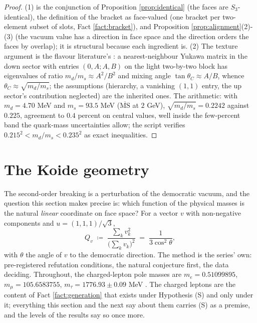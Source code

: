 \documentclass[11pt]{article}
\theoremstyle{definition}
\begin{document}
\begin{proof}
(1) is the conjunction of Proposition \ref{prop:identical} (the faces are $S_{3}$-identical), the definition of the bracket as face-valued (one bracket per two-element subset of slots, Fact \ref{fact:bracket}), and Proposition \ref{prop:alignment}(2)-(3) (the vacuum value has a direction in face space and the direction orders the faces by overlap); it is structural because each ingredient is. (2) The texture argument is the flavour literature's \cite{GST1968, Fritzsch1978}: a nearest-neighbour Yukawa matrix in the down sector with entries $(0, A; A, B)$ on the light two-by-two block has eigenvalues of ratio $m_{d}/m_{s} \approx A^{2}/B^{2}$ and mixing angle $\tan\theta_{C} \approx A/B$, whence $\theta_{C} \approx \sqrt{m_{d}/m_{s}}$; the assumptions (hierarchy, a vanishing $(1,1)$ entry, the up sector's contribution neglected) are the inherited ones. The arithmetic: with $m_{d} = 4.70$ MeV and $m_{s} = 93.5$ MeV \cite{PDG2024} ($\overline{\mathrm{MS}}$ at $2$ GeV), $\sqrt{m_{d}/m_{s}} = 0.2242$ against $0.225$, agreement to $0.4$ percent on central values, well inside the few-percent band the quark-mass uncertainties allow; the script verifies $0.215^{2} < m_{d}/m_{s} < 0.235^{2}$ as exact inequalities.
\end{proof}

\section{The Koide geometry}\label{sec:koide}

The second-order breaking is a perturbation of the democratic vacuum, and the question this section makes precise is: which function of the physical masses is the natural \emph{linear} coordinate on face space? For a vector $v$ with non-negative components and $u = (1,1,1)/\sqrt{3}$,
\[
Q_{v} \;\coloneqq\; \frac{\sum_{k} v_{k}^{2}}{\bigl(\sum_{k} v_{k}\bigr)^{2}} \;=\; \frac{1}{3\cos^{2}\theta},
\]
with $\theta$ the angle of $v$ to the democratic direction. The method is the series' own: pre-registered refutation conditions, the natural conjecture first, the data deciding. Throughout, the charged-lepton pole masses are $m_{e} = 0.51099895$, $m_{\mu} = 105.6583755$, $m_{\tau} = 1776.93 \pm 0.09$ MeV \cite{PDG2024}. The charged leptons are the content of Fact \ref{fact:generation} that exists under Hypothesis (S) and only under it; everything this section and the next say about them carries (S) as a premise, and the levels of the results say so once more.
\end{document}
